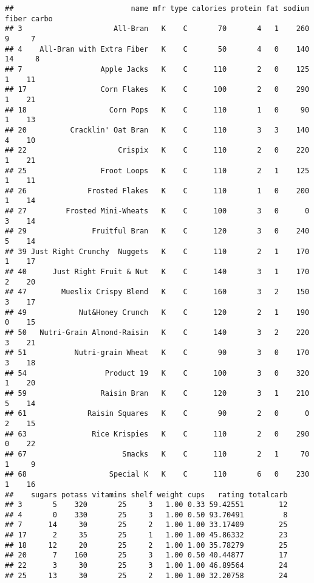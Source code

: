 \documentclass[
]{article}
\begin{document}
\begin{verbatim}
##                           name mfr type calories protein fat sodium fiber carbo
## 3                     All-Bran   K    C       70       4   1    260     9     7
## 4    All-Bran with Extra Fiber   K    C       50       4   0    140    14     8
## 7                  Apple Jacks   K    C      110       2   0    125     1    11
## 17                 Corn Flakes   K    C      100       2   0    290     1    21
## 18                   Corn Pops   K    C      110       1   0     90     1    13
## 20          Cracklin' Oat Bran   K    C      110       3   3    140     4    10
## 22                     Crispix   K    C      110       2   0    220     1    21
## 25                 Froot Loops   K    C      110       2   1    125     1    11
## 26              Frosted Flakes   K    C      110       1   0    200     1    14
## 27         Frosted Mini-Wheats   K    C      100       3   0      0     3    14
## 29               Fruitful Bran   K    C      120       3   0    240     5    14
## 39 Just Right Crunchy  Nuggets   K    C      110       2   1    170     1    17
## 40      Just Right Fruit & Nut   K    C      140       3   1    170     2    20
## 47        Mueslix Crispy Blend   K    C      160       3   2    150     3    17
## 49            Nut&Honey Crunch   K    C      120       2   1    190     0    15
## 50   Nutri-Grain Almond-Raisin   K    C      140       3   2    220     3    21
## 51           Nutri-grain Wheat   K    C       90       3   0    170     3    18
## 54                  Product 19   K    C      100       3   0    320     1    20
## 59                 Raisin Bran   K    C      120       3   1    210     5    14
## 61              Raisin Squares   K    C       90       2   0      0     2    15
## 63               Rice Krispies   K    C      110       2   0    290     0    22
## 67                      Smacks   K    C      110       2   1     70     1     9
## 68                   Special K   K    C      110       6   0    230     1    16
##    sugars potass vitamins shelf weight cups   rating totalcarb
## 3       5    320       25     3   1.00 0.33 59.42551        12
## 4       0    330       25     3   1.00 0.50 93.70491         8
## 7      14     30       25     2   1.00 1.00 33.17409        25
## 17      2     35       25     1   1.00 1.00 45.86332        23
## 18     12     20       25     2   1.00 1.00 35.78279        25
## 20      7    160       25     3   1.00 0.50 40.44877        17
## 22      3     30       25     3   1.00 1.00 46.89564        24
## 25     13     30       25     2   1.00 1.00 32.20758        24

\end{verbatim}
\end{document}
